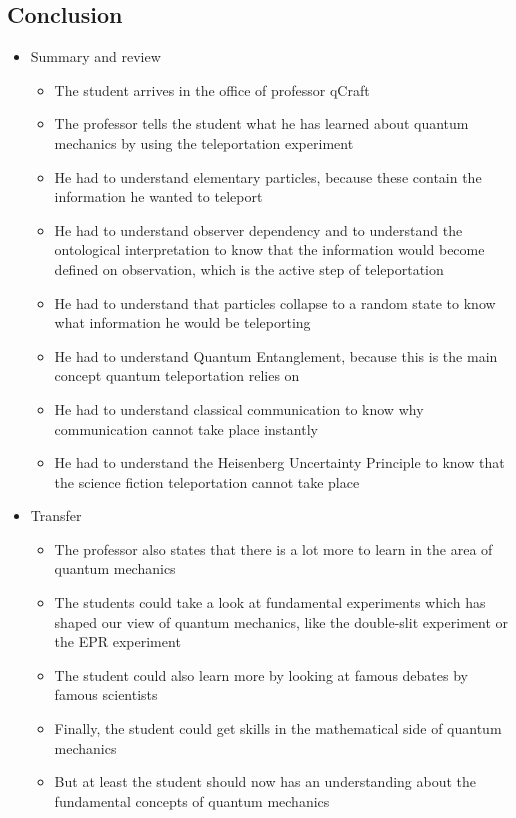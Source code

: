 \documentclass[11pt,twoside]{report} %
\begin{document}
\subsection{Conclusion}

\begin{itemize}
	\item Summary and review
	\begin{itemize}
		\item The student arrives in the office of professor qCraft
		\item The professor tells the student what he has learned about quantum mechanics by using the teleportation experiment
		\item He had to understand elementary particles, because these contain the information he wanted to teleport
		\item He had to understand observer dependency and to understand the ontological interpretation to know that the information would become defined on observation, which is the active step of teleportation
		\item He had to understand that particles collapse to a random state to know what information he would be teleporting
		\item He had to understand Quantum Entanglement, because this is the main concept quantum teleportation relies on
		\item He had to understand classical communication to know why communication cannot take place instantly
		\item He had to understand the Heisenberg Uncertainty Principle to know that the science fiction teleportation cannot take place
	\end{itemize}
	\item Transfer
	\begin{itemize}
		\item The professor also states that there is a lot more to learn in the area of quantum mechanics
		\item The students could take a look at fundamental experiments which has shaped our view of quantum mechanics, like the double-slit experiment or the EPR experiment
		\item The student could also learn more by looking at famous debates by famous scientists
		\item Finally, the student could get skills in the mathematical side of quantum mechanics
		\item But at least the student should now has an understanding about the fundamental concepts of quantum mechanics

\end{itemize}
\end{itemize}
\end{document}
